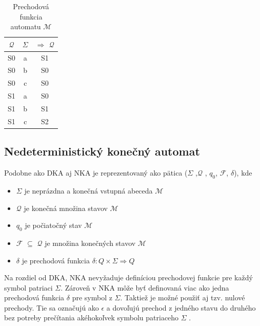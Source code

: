 \begin{table}[!htbp]
    \begin{center}
        \begin{tabular}{c c|c}
            $\mathcal{Q}$ & $\Sigma$ & $\Rightarrow$ $\mathcal{Q}$ \\ \hline
            S0            & a        & S1                          \\
            S0            & b        & S0                          \\
            S0            & c        & S0                          \\
            S1            & a        & S0                          \\
            S1            & b        & S1                          \\
            S1            & c        & S2                          \\
        \end{tabular}
        \caption{Prechodová funkcia automatu $\mathcal{M}$}
        \label{table:dfaPrechodovaFunckcia}
    \end{center}
\end{table}


\subsection{Nedeterministický konečný automat}
\noindent \par
Podobne ako DKA aj NKA je reprezentovaný ako  pätica ($\Sigma$ ,$\mathcal{Q}$ , $q_0$, $\mathcal{F}$, $\delta$), kde
\begin{itemize}
    \item $\Sigma$ je neprázdna a konečná vstupná abeceda $\mathcal{M}$
    \item $\mathcal{Q}$ je konečná množina stavov $\mathcal{M}$
    \item $q_0$ je počiatočný stav $\mathcal{M}$
    \item $\mathcal{F}$ $\subseteq$ $\mathcal{Q}$ je množina konečných stavov $\mathcal{M}$
    \item $\delta$ je prechodová funkcia  \begin{math}\delta : Q \times \Sigma \Rightarrow Q\end{math}
\end{itemize}

Na rozdiel od DKA, NKA nevyžaduje definíciou prechodovej funkcie pre každý symbol
patriaci $\Sigma$. Zároveň v NKA môže byť definovaná viac ako jedna prechodová funkcia $\delta$ pre symbol z $\Sigma$.
Taktiež je možné použiť aj tzv. nulové prechody.
Tie sa označujú ako $\epsilon$ a dovoľujú prechod z jedného stavu do druhého bez potreby prečítania akéhokoľvek symbolu patriaceho $\Sigma$ \cite{FiniteStateMachines}.